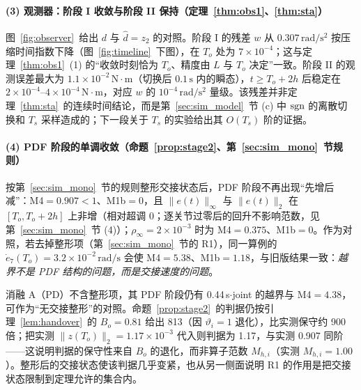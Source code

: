 \paragraph{(3) 观测器：阶段 I 收敛与阶段 II 保持（定理~\ref{thm:obs1}、\ref{thm:sta}）}
图~\ref{fig:observer}~给出 \(d\) 与 \(\hat d=z_2\) 的对照。阶段 I 的残差 \(w\) 从 \(0.307\,\mathrm{rad/s^2}\) 按压缩时间指数下降（图~\ref{fig:timeline}~下图），在 \(T_o\) 处为 \(7\times10^{-4}\)；这与定理~\ref{thm:obs1}~(1) 的“收敛时刻恰为 \(T_o\)、精度由 \(L\) 与 \(T_o\) 决定”一致。阶段 II 的观测误差最大为 \(1.1\times10^{-2}\,\mathrm{N\cdot m}\)（切换后 \(0.1\,\mathrm{s}\) 内的瞬态），\(t\ge T_o+2h\) 后稳定在 \(2\times10^{-4}\)--\(4\times10^{-4}\,\mathrm{N\cdot m}\)，对应 \(w\) 的 \(10^{-4}\,\mathrm{rad/s^2}\) 量级。该残差并非定理~\ref{thm:sta}~的连续时间结论，而是第~\ref{sec:sim_model}~节 (c) 中 \(\operatorname{sgn}\) 的离散切换和 \(T_s\) 采样造成的；下一段关于 \(T_s\) 的实验给出其 $O(T_s)$ 阶的证据。

\paragraph{(4) PDF 阶段的单调收敛（命题~\ref{prop:stage2}、第~\ref{sec:sim_mono}~节规则）}
按第~\ref{sec:sim_mono}~节的规则整形交接状态后，PDF 阶段不再出现“先增后减”：M4\(=0.907<1\)、M1b\(=0\)，且 \(\lVert e(t)\rVert_\infty\) 与 \(\lVert e(t)\rVert_2\) 在 \([T_o,T_o+2h]\) 上非增（相对超调 0；逐关节过零后的回升不影响范数，见第~\ref{sec:sim_mono}~节 (4)）；\(\rho_\infty=2\times10^{-3}\) 时为 M4\(=0.375\)、M1b\(=0\)。作为对照，若去掉整形项（第~\ref{sec:sim_mono}~节的 R1），同一算例的 \(\dot e_7(T_o)=3.2\times10^{-2}\,\mathrm{rad/s}\) 会使 M4\(=5.38\)、M1b\(=1.18\)，与旧版结果一致：\emph{越界不是 PDF 结构的问题，而是交接速度的问题}。

消融 A（PD）不含整形项，其 PDF 阶段仍有 0.44\,s\(\cdot\)joint 的越界与 M4\(=4.38\)，可作为“无交接整形”的对照。命题~\ref{prop:stage2}~的判据仍按引理~\ref{lem:handover}~的 \(B_o=0.81\) 给出 813（因 \(\vartheta_i=1\) 退化），比实测保守约 900 倍；把实测 \(\lVert z(T_o)\rVert_2=1.17\times10^{-3}\) 代入则判据为 1.17，与实测 0.907 同阶——这说明判据的保守性来自 \(B_o\) 的退化，而非算子范数 \(M_{h,i}\)（实测 \(M_{h,i}=1.00\)）。整形后的交接状态使该判据几乎变紧，也从另一侧面说明 R1 的作用是把交接状态限制到定理允许的集合内。

